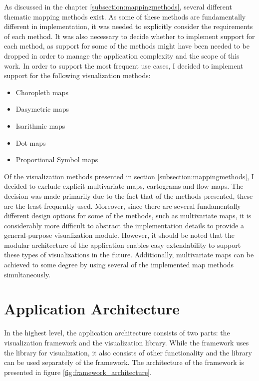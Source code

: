 As discussed in the chapter \ref{subsection:mappingmethods}, several different thematic mapping methods exist. As some of these methods are fundamentally different in implementation, it was needed to explicitly consider the requirements of each method. It was also necessary to decide whether to implement support for each method, as support for some of the methods might have been needed to be dropped in order to manage the application complexity and the scope of this work. In order to support the most frequent use cases, I decided to implement support for the following visualization methods:

\begin{itemize}
	\item Choropleth maps
	\item Dasymetric maps
	\item Isarithmic maps
	\item Dot maps
	\item Proportional Symbol maps
\end{itemize}

Of the visualization methods presented in section \ref{subsection:mappingmethods}, I decided to exclude explicit multivariate maps, cartograms and flow maps. The decision was made primarily due to the fact that of the methods presented, these are the least frequently used. Moreover, since there are several fundamentally different design options for some of the methods, such as multivariate maps, it is considerably more difficult to abstract the implementation details to provide a general-purpose visualization module. However, it should be noted that the modular architecture of the application enables easy extendability to support these types of visualizations in the future. Additionally, multivariate maps can be achieved to some degree by using several of the implemented map methods simultaneously.

\section{Application Architecture}

In the highest level, the application architecture consists of two parts: the visualization framework and the visualization library. While the framework uses the library for visualization, it also consists of other functionality and the library can be used separately of the framework. The architecture of the framework is presented in figure \ref{fig:framework_architecture}.

